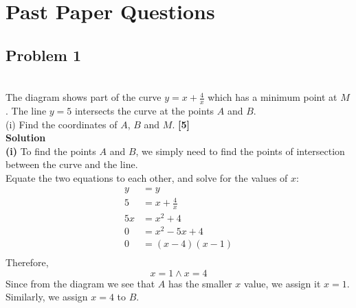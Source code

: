 \documentclass[hidelinks, a4paper, 12pt]{article}
\newcommand{\bd}{\textbf}
\newcommand{\n}{\\[\baselineskip]}
\begin{document}
    \section{Past Paper Questions}
        \subsection{Problem 1}
            \n
            The diagram shows part of the curve $y = x + \frac{4}{x}$ which has a minimum point at $M$. 
            The line $y=5$ intersects the curve at the points $A$ and $B$.\n
            (i) Find the coordinates of $A$, $B$ and $M$. \bd{[5]}\n
            \bd{Solution}\n
            \bd{(i)} To find the points $A$ and $B$, we simply need to find the points of intersection between the curve and the line.\n
            Equate the two equations to each other, and solve for the values of $x$:
            \[\begin{split}
                y &= y\\
                5 &= x + \frac{4}{x}\\
                5x &= x^2 + 4\\
                0 &= x^2 -5x + 4\\
                0 &= (x-4)(x-1)\\
            \end{split}\]
            Therefore,
            \[x = 1 \land x = 4\]
            Since from the diagram we see that $A$ has the smaller $x$ value, we assign it $x = 1$. Similarly, we assign $x=4$ to $B$.\n
\end{document}
